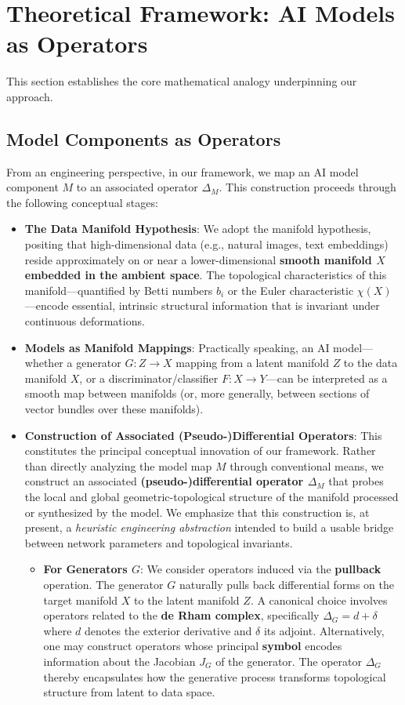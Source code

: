 \documentclass[10pt,leqno]{amsart}
\begin{document}
\section{Theoretical Framework: AI Models as Operators}
This section establishes the core mathematical analogy underpinning our approach.

\subsection{Model Components as Operators}
From an engineering perspective, in our framework, we map an AI model component $M$ to an associated operator $\Delta_M$. This construction proceeds through the following conceptual stages:

\begin{itemize}
\item \textbf{The Data Manifold Hypothesis}: We adopt the manifold hypothesis, positing that high-dimensional data (e.g., natural images, text embeddings) reside approximately on or near a lower-dimensional \textbf{smooth manifold $X$ embedded in the ambient space}. The topological characteristics of this manifold---quantified by Betti numbers $b_i$ or the Euler characteristic $\chi(X)$---encode essential, intrinsic structural information that is invariant under continuous deformations.

\item \textbf{Models as Manifold Mappings}: Practically speaking, an AI model---whether a generator $G: Z \to X$ mapping from a latent manifold $Z$ to the data manifold $X$, or a discriminator/classifier $F: X \to Y$---can be interpreted as a smooth map between manifolds (or, more generally, between sections of vector bundles over these manifolds).

\item \textbf{Construction of Associated (Pseudo-)Differential Operators}: This constitutes the principal conceptual innovation of our framework. Rather than directly analyzing the model map $M$ through conventional means, we construct an associated \textbf{(pseudo-)differential operator $\Delta_M$} that probes the local and global geometric-topological structure of the manifold processed or synthesized by the model. We emphasize that this construction is, at present, a \emph{heuristic engineering abstraction} intended to build a usable bridge between network parameters and topological invariants.
    \begin{itemize}
    \item \textbf{For Generators $G$}: We consider operators induced via the \textbf{pullback} operation. The generator $G$ naturally pulls back differential forms on the target manifold $X$ to the latent manifold $Z$. A canonical choice involves operators related to the \textbf{de Rham complex}, specifically $\Delta_G = d + \delta$ where $d$ denotes the exterior derivative and $\delta$ its adjoint. Alternatively, one may construct operators whose principal \textbf{symbol} encodes information about the Jacobian $J_G$ of the generator. The operator $\Delta_G$ thereby encapsulates how the generative process transforms topological structure from latent to data space.
    

\end{itemize}
\end{itemize}
\end{document}
